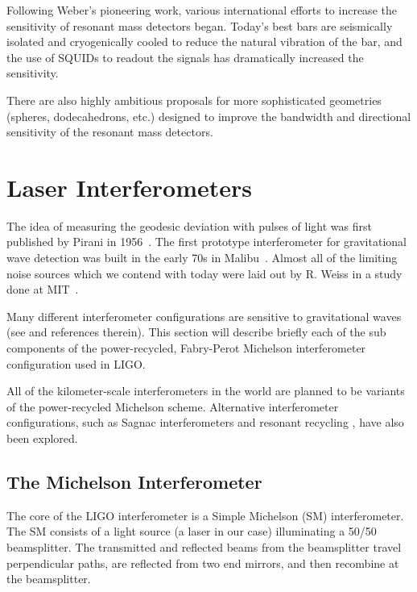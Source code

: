 Following Weber's pioneering work, various international efforts 
to increase the sensitivity of resonant mass detectors began.
Today's best
bars are seismically isolated and cryogenically cooled to reduce the
natural vibration of the bar, and the use of SQUIDs to readout the signals
has dramatically increased the sensitivity\cite{Bars}.

There are also highly ambitious proposals\cite{Spheres} for more
sophisticated geometries (spheres, dodecahedrons, etc.) designed to improve the 
bandwidth and directional sensitivity of the resonant mass detectors.



\section{Laser Interferometers}

The idea of measuring the geodesic deviation with pulses of light was
first published by Pirani in 1956~\cite{Pirani:GR}.
The first prototype interferometer for gravitational wave detection was built
in the early 70s in Malibu~\cite{Forward:Interferometer}. Almost all of the
limiting noise sources which we contend with today were laid out by R. Weiss 
in a study done at MIT~\cite{Rai:QPR}.

Many different interferometer configurations are sensitive to gravitational waves
(see \cite{Mizuno:Thesis} and references therein).
This section will describe briefly each of the sub components of the
power-recycled, Fabry-Perot Michelson interferometer configuration used in
LIGO.

All of the kilometer-scale interferometers in the world are planned to
be variants of the power-recycled Michelson scheme. Alternative 
interferometer configurations, such as Sagnac interferometers \cite{Rai:NSF,Byer:Sagnac}
and resonant recycling \cite{Drever:Houches}, have also been explored.


\subsection{The Michelson Interferometer}

The core of the LIGO interferometer is a Simple Michelson (SM) interferometer. 
The SM consists of a light source (a laser in our case) illuminating a 50/50 beamsplitter.
The transmitted and reflected beams from the beamsplitter travel perpendicular
paths, are reflected from two end mirrors, and then recombine at the beamsplitter.

